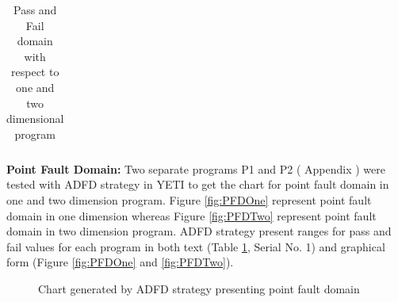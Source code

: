 \documentclass[runningheads,a4paper]{llncs}
\begin{document}
\begin{table}[H]
\begin{tabular}{|c|c|c|l|l|l|}
				
\end{tabular}
\bigskip
\caption{Pass and Fail domain with respect to one and two dimensional program}
\label{tab:failtable}
\end{table}




\textbf{Point Fault Domain:}  Two separate programs P1 and P2 ( Appendix ) were tested with ADFD strategy in YETI to get the chart for point fault domain in one and two dimension program. Figure \ref{fig:PFDOne} represent point fault domain in one dimension whereas Figure \ref{fig:PFDTwo} represent point fault domain in two dimension program. ADFD strategy present ranges for pass and fail values for each program in both text (Table \ref{tab:failtable}, Serial No. 1) and graphical form (Figure \ref{fig:PFDOne} and \ref{fig:PFDTwo}). \\


\begin{figure} [H]



\caption{Chart generated by ADFD strategy presenting point fault domain}
\end{figure}

\end{document}
